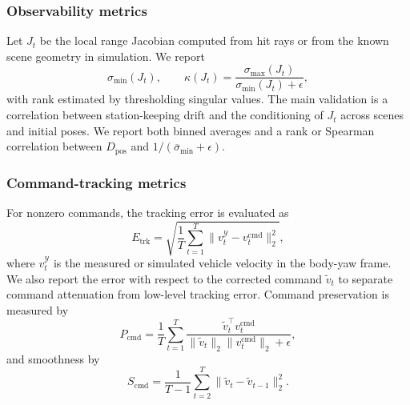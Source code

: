 \documentclass[11pt]{article}
\begin{document}
\subsubsection{Observability metrics}
Let $J_t$ be the local range Jacobian computed from hit rays or from the known
scene geometry in simulation.  We report
\begin{equation}
    \sigma_{\min}(J_t), \qquad
    \kappa(J_t)=\frac{\sigma_{\max}(J_t)}{\sigma_{\min}(J_t)+\epsilon},
    \label{eq:metric_observability}
\end{equation}
with rank estimated by thresholding singular values.  The main validation is a
correlation between station-keeping drift and the conditioning of $J_t$ across
scenes and initial poses.  We report both binned averages and a rank or
Spearman correlation between $D_{\mathrm{pos}}$ and
$1/(\overline{\sigma}_{\min}+\epsilon)$.

\subsubsection{Command-tracking metrics}
For nonzero commands, the tracking error is evaluated as
\begin{equation}
    E_{\mathrm{trk}} =
    \sqrt{\frac{1}{T}\sum_{t=1}^{T}
    \|v^{\mathcal{Y}}_t-v^{\mathrm{cmd}}_t\|_2^2},
    \label{eq:metric_tracking_rmse}
\end{equation}
where $v^{\mathcal{Y}}_t$ is the measured or simulated vehicle velocity in the
body-yaw frame.  We also report the error with respect to the corrected command
$\tilde v_t$ to separate command attenuation from low-level tracking error.
Command preservation is measured by
\begin{equation}
    P_{\mathrm{cmd}} =
    \frac{1}{T}\sum_{t=1}^{T}
    \frac{\tilde v_t^\top v^{\mathrm{cmd}}_t}
    {\|\tilde v_t\|_2\|v^{\mathrm{cmd}}_t\|_2+\epsilon},
    \label{eq:metric_command_preservation}
\end{equation}
and smoothness by
\begin{equation}
    S_{\mathrm{cmd}} = \frac{1}{T-1}\sum_{t=2}^{T}
    \|\tilde v_t-\tilde v_{t-1}\|_2^2.
    \label{eq:metric_smoothness}
\end{equation}
\end{document}
